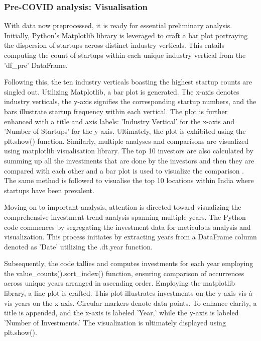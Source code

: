 \documentclass[12pt]{article}
\begin{document}
\subsubsection{Pre-COVID analysis: Visualisation}

With data now preprocessed, it is ready for essential preliminary analysis. Initially, Python's Matplotlib library is leveraged to craft a bar plot portraying the dispersion of startups across distinct industry verticals. This entails computing the count of startups within each unique industry vertical from the 'df\_pre' DataFrame.

Following this, the ten industry verticals boasting the highest startup counts are singled out. Utilizing Matplotlib, a bar plot is generated. The x-axis denotes industry verticals, the y-axis signifies the corresponding startup numbers, and the bars illustrate startup frequency within each vertical. The plot is further enhanced with a title and axis labels: 'Industry Vertical' for the x-axis and 'Number of Startups' for the y-axis. Ultimately, the plot is exhibited using the plt.show() function. Similarly, multiple analyses and comparisons are visualized using matplotlib visualisation library. The top 10 investors are also calculated by summing up all the investments that are done by the investors and then they are compared with each other and a bar plot is used to visualize the comparison \citep{zhimeng2021assessing}. The same method is followed to visualise the top 10 locations within India where startups have been prevalent.

Moving on to important analysis, attention is directed toward visualizing the comprehensive investment trend analysis spanning multiple years. The Python code commences by segregating the investment data for meticulous analysis and visualization. This process initiates by extracting years from a DataFrame column denoted as 'Date' utilizing the .dt.year function.

Subsequently, the code tallies and computes investments for each year employing the value\_counts().sort\_index() function, ensuring comparison of occurrences across unique years arranged in ascending order. Employing the matplotlib library, a line plot is crafted. This plot illustrates investments on the y-axis vis-à-vis years on the x-axis. Circular markers denote data points. To enhance clarity, a title is appended, and the x-axis is labeled 'Year,' while the y-axis is labeled 'Number of Investments.' The visualization is ultimately displayed using plt.show().
\end{document}
